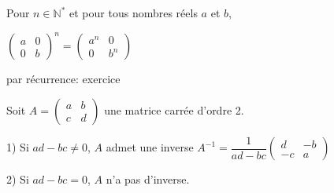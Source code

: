 \documentclass[french]{book}
\begin{document}
   \begin{thm}
   
   Pour $n \in \mathbb{N}^{*}$ et pour tous nombres réels $a$ et $b$,
    
    \begin{center}
    $\begin{pmatrix}
    a & 0  \\ 
   0 & b 
   \end{pmatrix}^{n}=\begin{pmatrix}
    a^{n} & 0  \\ 
   0 & b^{n} 
   \end{pmatrix}$
    \end{center}
   \end{thm}
   
    \begin{demo}
    par récurrence: exercice
	\end{demo}
	
	    
\begin{thm}
    
    Soit $A=\begin{pmatrix}
    a & b  \\ 
   c & d 
   \end{pmatrix}$ une matrice carrée d'ordre 2.
   
   1) Si $ad-bc\neq 0$, $A$ admet une inverse $\boxed{A^{-1}=\dfrac{1}{ad-bc}\begin{pmatrix}
    d &-b  \\ 
   -c & a 
   \end{pmatrix}}$
   
   2) Si $ad-bc=0$, $A$ n'a pas d'inverse.
   
  \end{thm}
   
\end{document}

